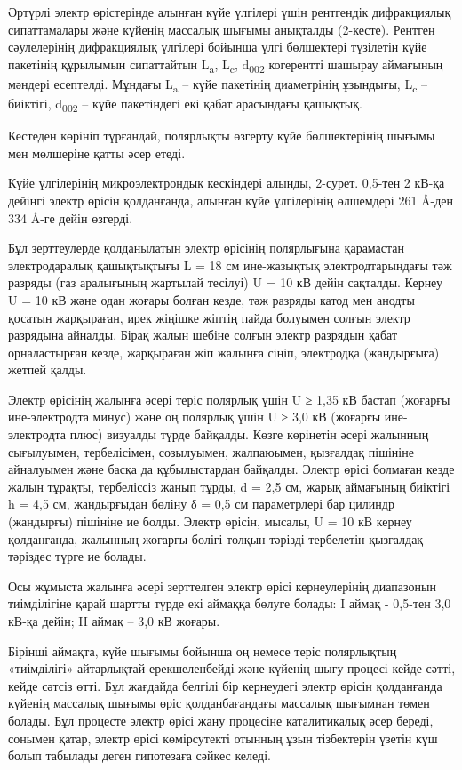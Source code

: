 \begin{multicols}{2}
Әртүрлі электр өрістерінде алынған күйе үлгілері үшін рентгендік
дифракциялық сипаттамалары және күйенің массалық шығымы анықталды
(2-кесте). Рентген сәулелерінің дифракциялық үлгілері бойынша үлгі
бөлшектері түзілетін күйе пакетінің құрылымын сипаттайтын
L\textsubscript{a}, L\textsubscript{c}, d\textsubscript{002} когерентті
шашырау аймағының мәндері есептелді. Мұндағы L\textsubscript{a} -- күйе
пакетінің диаметрінің ұзындығы, L\textsubscript{c} -- биіктігі,
d\textsubscript{002} -- күйе пакетіндегі екі қабат арасындағы қашықтық.

Кестеден көрініп тұрғандай, полярлықты өзгерту күйе бөлшектерінің шығымы
мен мөлшеріне қатты әсер етеді.

Күйе үлгілерінің микроэлектрондық кескіндері алынды, 2-сурет. 0,5-тен 2
кВ-қа дейінгі электр өрісін қолданғанда, алынған күйе үлгілерінің
өлшемдері 261 Å-ден 334 Å-ге дейін өзгерді.

Бұл зерттеулерде қолданылатын электр өрісінің полярлығына қарамастан
электродаралық қашықтықтығы L = 18 см ине-жазықтық электродтарындағы тәж
разряды (газ аралығының жартылай тесілуі) U = 10 кВ дейін сақталды.
Кернеу U = 10 кВ және одан жоғары болған кезде, тәж разряды катод мен
анодты қосатын жарқыраған, ирек жіңішке жіптің пайда болуымен солғын
электр разрядына айналды. Бірақ жалын шебіне солғын электр разрядын
қабат орналастырған кезде, жарқыраған жіп жалынға сіңіп, электродқа
(жандырғыға) жетпей қалды.

Электр өрісінің жалынға әсері теріс полярлық үшін U ≥ 1,35 кВ бастап
(жоғарғы ине-электродта минус) және оң полярлық үшін U ≥ 3,0 кВ (жоғарғы
ине-электродта плюс) визуалды түрде байқалды. Көзге көрінетін әсері
жалынның сығылуымен, тербелісімен, созылуымен, жалпаюымен, қызғалдақ
пішініне айналуымен және басқа да құбылыстардан байқалды. Электр өрісі
болмаған кезде жалын тұрақты, тербеліссіз жанып тұрды, d = 2,5 см, жарық
аймағының биіктігі h = 4,5 см, жандырғыдан бөліну δ = 0,5 см
параметрлері бар цилиндр (жандырғы) пішініне ие болды. Электр өрісін,
мысалы, U = 10 кВ кернеу қолданғанда, жалынның жоғарғы бөлігі толқын
тәрізді тербелетін қызғалдақ тәріздес түрге ие болады.

Осы жұмыста жалынға әсері зерттелген электр өрісі кернеулерінің
диапазонын тиімділігіне қарай шартты түрде екі аймаққа бөлуге болады: I
аймақ - 0,5-тен 3,0 кВ-қа дейін; II аймақ -- 3,0 кВ жоғары.

Бірінші аймақта, күйе шығымы бойынша оң немесе теріс полярлықтың
«тиімділігі» айтарлықтай ерекшеленбейді және күйенің шығу процесі кейде
сәтті, кейде сәтсіз өтті. Бұл жағдайда белгілі бір кернеудегі электр
өрісін қолданғанда күйенің массалық шығымы өріс қолданбағандағы массалық
шығымнан төмен болады. Бұл процесте электр өрісі жану процесіне
каталитикалық әсер береді, сонымен қатар, электр өрісі көмірсутекті
отынның ұзын тізбектерін үзетін күш болып табылады деген гипотезаға
сәйкес келеді.


\end{multicols}
